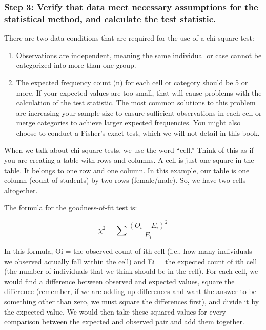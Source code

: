 \documentclass[
  letterpaper,
  DIV=11,
  numbers=noendperiod]{scrreprt}
\begin{document}
\subsubsection*{Step 3: Verify that data meet necessary assumptions for
the statistical method, and calculate the test
statistic.}\label{step-3-verify-that-data-meet-necessary-assumptions-for-the-statistical-method-and-calculate-the-test-statistic.-1}

There are two data conditions that are required for the use of a
chi-square test:

\begin{enumerate}
\def\labelenumi{\arabic{enumi}.}
\item
  Observations are independent, meaning the same individual or case
  cannot be categorized into more than one group.
\item
  The expected frequency count (n) for each cell or category should be 5
  or more. If your expected values are too small, that will cause
  problems with the calculation of the test statistic. The most common
  solutions to this problem are increasing your sample size to ensure
  sufficient observations in each cell or merge categories to achieve
  larger expected frequencies. You might also choose to conduct a
  Fisher's exact test, which we will not detail in this book.
\end{enumerate}

When we talk about chi-square tests, we use the word ``cell.'' Think of
this as if you are creating a table with rows and columns. A cell is
just one square in the table. It belongs to one row and one column. In
this example, our table is one column (count of students) by two rows
(female/male). So, we have two cells altogether.

The formula for the goodness-of-fit test is:

\[
\chi^2 = \sum \frac{(O_i - E_i)^2}{E_i}
\]

In this formula, Oi = the observed count of ith cell (i.e., how many
individuals we observed actually fall within the cell) and Ei = the
expected count of ith cell (the number of individuals that we think
should be in the cell). For each cell, we would find a difference
between observed and expected values, square the difference (remember,
if we are adding up differences and want the answer to be something
other than zero, we must square the differences first), and divide it by
the expected value. We would then take these squared values for every
comparison between the expected and observed pair and add them together.
\end{document}
